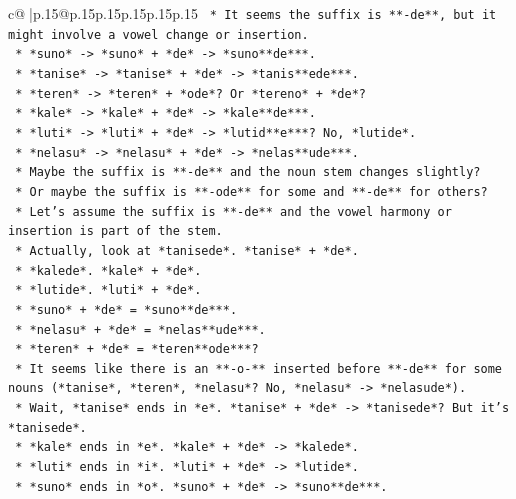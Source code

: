 \documentclass{article}
\begin{document}
{\begin{supertabular}{c@{$\;$}|p{.15\linewidth}@{}p{.15\linewidth}p{.15\linewidth}p{.15\linewidth}p{.15\linewidth}p{.15\linewidth}}
{{{\texttt{            *   It seems the suffix is **{-}de**, but it might involve a vowel change or insertion.} \\
\texttt{            *   *suno* {-}> *suno* + *de* {-}> *suno**de***.} \\
\texttt{            *   *tanise* {-}> *tanise* + *de* {-}> *tanis**ede***.} \\
\texttt{            *   *teren* {-}> *teren* + *ode*? Or *tereno* + *de*?} \\
\texttt{            *   *kale* {-}> *kale* + *de* {-}> *kale**de***.} \\
\texttt{            *   *luti* {-}> *luti* + *de* {-}> *lutid**e***? No, *lutide*.} \\
\texttt{            *   *nelasu* {-}> *nelasu* + *de* {-}> *nelas**ude***.} \\
\texttt{            *   Maybe the suffix is **{-}de** and the noun stem changes slightly?} \\
\texttt{            *   Or maybe the suffix is **{-}ode** for some and **{-}de** for others?} \\
\texttt{            *   Let's assume the suffix is **{-}de** and the vowel harmony or insertion is part of the stem.} \\
\texttt{            *   Actually, look at *tanisede*. *tanise* + *de*.} \\
\texttt{            *   *kalede*. *kale* + *de*.} \\
\texttt{            *   *lutide*. *luti* + *de*.} \\
\texttt{            *   *suno* + *de* = *suno**de***.} \\
\texttt{            *   *nelasu* + *de* = *nelas**ude***.} \\
\texttt{            *   *teren* + *de* = *teren**ode***?} \\
\texttt{            *   It seems like there is an **{-}o{-}** inserted before **{-}de** for some nouns (*tanise*, *teren*, *nelasu*? No, *nelasu* {-}> *nelasude*).} \\
\texttt{            *   Wait, *tanise* ends in *e*. *tanise* + *de* {-}> *tanisede*? But it's *tanisede*.} \\
\texttt{            *   *kale* ends in *e*. *kale* + *de* {-}> *kalede*.} \\
\texttt{            *   *luti* ends in *i*. *luti* + *de* {-}> *lutide*.} \\
\texttt{            *   *suno* ends in *o*. *suno* + *de* {-}> *suno**de***.} \\
}}}
\end{supertabular}}
\end{document}

